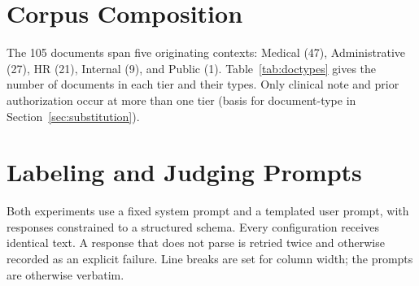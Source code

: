 \documentclass[conference]{IEEEtran}
\begin{document}
\section{Corpus Composition}
\label{app:dataset}
The 105 documents span five originating contexts: Medical (47), Administrative
(27), HR (21), Internal (9), and Public (1). Table~\ref{tab:doctypes} gives the
number of documents in each tier and their types. Only clinical note and prior
authorization occur at more than one tier  %
(basis for document-type in Section~\ref{sec:substitution}).

\begin{table}[!ht]
\centering
\caption{Document types by sensitivity tier, with per-type counts in
parentheses.}
\label{tab:doctypes}
\footnotesize
{}
\end{table}

\section{Labeling and Judging Prompts}
\label{app:prompts}
Both experiments use a fixed system prompt and a templated user prompt, with
responses constrained to a structured schema. Every configuration receives
identical text. A response that does not parse is retried twice and otherwise
recorded as an explicit failure. Line breaks are set for column width; the
prompts are otherwise verbatim.
\end{document}
